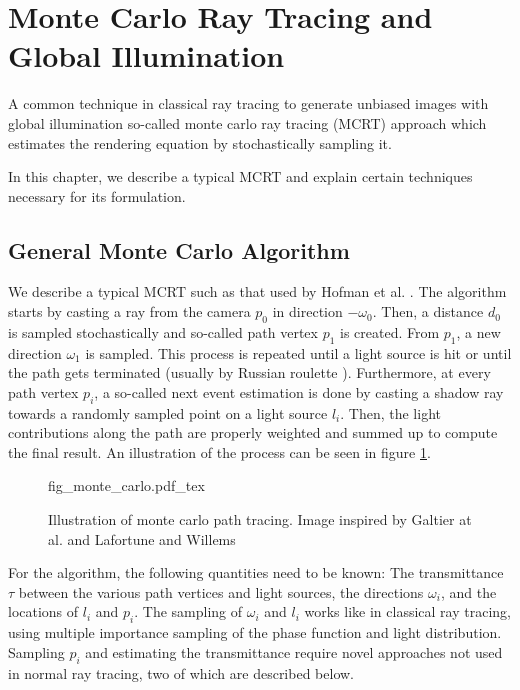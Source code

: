 \section{Monte Carlo Ray Tracing and Global Illumination}
\label{sec:mc}
A common technique in classical ray tracing to generate unbiased images with global illumination so-called monte carlo ray tracing (MCRT) approach \cite{mc_siggraph} which estimates the rendering equation by stochastically sampling it.

In this chapter, we describe a typical MCRT and explain certain techniques necessary for its formulation.
\subsection{General Monte Carlo Algorithm}
We describe a typical MCRT such as that used by Hofman et al. \cite{10.1145/3451256}.
The algorithm starts by casting a ray from the camera $p_0$ in direction $-\omega_0$. Then, a distance $d_0$ is sampled stochastically and so-called path vertex $p_1$ is created. From $p_1$, a new direction $\omega_1$ is sampled. This process is repeated until a light source is hit or until the path gets terminated (usually by Russian roulette \cite{P-766}). Furthermore, at every path vertex $p_i$, a so-called next event estimation \cite{10.1145/3305366.3328079} is done by casting a shadow ray towards a randomly sampled point on a light source $l_i$. Then, the light contributions along the path are properly weighted \cite{10.1145/218380.218498} and summed up to compute the final result.
An illustration of the process can be seen in figure \ref{fig:monte_carlo}.


\begin{figure}
\centering
\def\svgwidth{\columnwidth}
{fig_monte_carlo.pdf_tex}

\caption{Illustration of monte carlo path tracing. Image inspired by Galtier at al. \cite{GALTIER201357} and Lafortune and Willems \cite{bidirectional-ray-tracing}}
\label{fig:monte_carlo}
\end{figure}


For the algorithm, the following quantities need to be known: The transmittance $\tau$ between the various path vertices and light sources, the directions $\omega_i$, and the locations of $l_i$ and $p_i$.
The sampling of $\omega_i$ and $l_i$ works like in classical ray tracing, using multiple importance sampling\cite{10.1145/218380.218498} of the phase function and light distribution. Sampling $p_i$ and estimating the transmittance require novel approaches not used in normal ray tracing, two of which are described below. 
